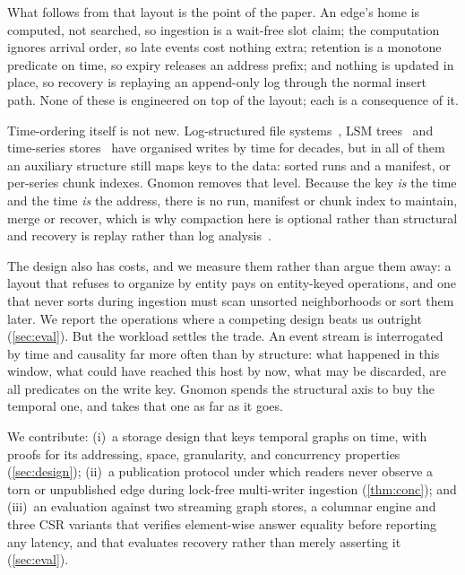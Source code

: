 \documentclass[letterpaper,twocolumn,10pt]{article}
\newcommand{\sys}{Gnomon\xspace}
\begin{document}
What follows from that layout is the point of the paper. An edge's
home is computed, not searched, so ingestion is a wait-free slot
claim; the computation ignores arrival order, so late events cost
nothing extra; retention is a monotone predicate on time, so expiry
releases an address prefix; and nothing is updated in place, so
recovery is replaying an append-only log through the normal insert
path. None of these is engineered on top of the layout; each is a
consequence of it.

Time-ordering itself is not new. Log-structured file
systems~\cite{rosenblum1991lfs}, LSM trees~\cite{oneil1996lsm} and
time-series stores~\cite{pelkonen2015gorilla} have organised writes by
time for decades, but in all of them an auxiliary structure still maps
keys to the data: sorted runs and a manifest, or per-series chunk
indexes. \sys removes that level. Because the key \emph{is} the time
and the time \emph{is} the address, there is no run, manifest or chunk
index to maintain, merge or recover, which is why compaction here is
optional rather than structural and recovery is replay rather than log
analysis~\cite{mohan1992aries}.

The design also has costs, and we measure them rather than argue them
away: a layout that refuses to organize by entity pays on entity-keyed
operations, and one that never sorts during ingestion must scan
unsorted neighborhoods or sort them later. We report the operations
where a competing design beats us outright (\cref{sec:eval}). But the
workload settles the trade. An event stream is interrogated by time and
causality far more often than by structure: what happened in this
window, what could have reached this host by now, what may be
discarded, are all predicates on the write key. \sys spends the
structural axis to buy the temporal one, and takes that one as far as
it goes.

We contribute: (i)~a storage design that keys temporal graphs on time,
with proofs for its addressing, space, granularity, and concurrency
properties (\cref{sec:design}); (ii)~a publication protocol under
which readers never observe a torn or unpublished edge during
lock-free multi-writer ingestion (\cref{thm:conc}); and (iii)~an
evaluation against two streaming graph stores, a columnar engine and
three CSR variants that verifies element-wise answer equality before
reporting any latency, and that evaluates recovery rather than merely
asserting it (\cref{sec:eval}).

\end{document}
